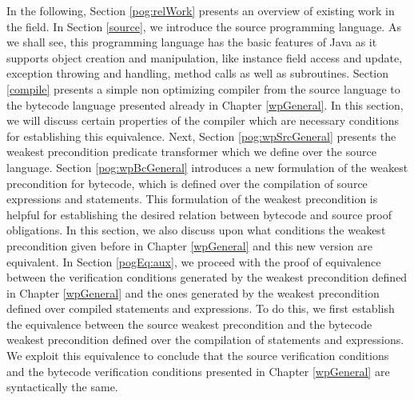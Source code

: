 In the following, Section \ref{pog:relWork} presents an overview of existing work in the field. In Section \ref{source}, 
 we introduce the source programming language. As we shall see,
this programming language has the basic features of Java as it supports object creation and manipulation, like instance 
field access and  update, 
 exception throwing and handling, method calls as well as subroutines. Section \ref{compile} presents a simple non optimizing compiler from the source language to the bytecode
 language presented already in Chapter \ref{wpGeneral}. In this section, we will discuss certain properties of the 
compiler which are necessary conditions for establishing this equivalence. Next, Section \ref{pog:wpSrcGeneral} presents the weakest precondition predicate 
transformer which we define over the source language. Section  \ref{pog:wpBcGeneral} introduces a new formulation of the weakest precondition for bytecode, which 
is defined over the  compilation of source expressions and statements. This formulation of the weakest precondition
 is helpful for establishing the desired 
relation between bytecode and source proof obligations.
 In this section, we also discuss upon what conditions
the weakest precondition given before in Chapter \ref{wpGeneral} and 
this new version are equivalent.
In Section \ref{pogEq:aux}, we proceed with the proof of equivalence between the verification conditions generated 
by the weakest precondition defined in  Chapter \ref{wpGeneral} and the ones generated by the weakest precondition defined over 
compiled statements and expressions. To do this, we first establish  the equivalence between the source weakest
 precondition and the bytecode weakest precondition defined over the compilation of statements and expressions.
 We exploit this equivalence to conclude that the source verification conditions and the bytecode verification conditions 
presented in Chapter \ref{wpGeneral} are syntactically the same.
 








